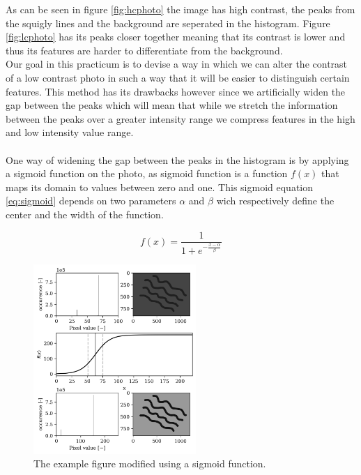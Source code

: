 As can be seen in figure \ref{fig:hcphoto} the image has high contrast, the peaks from the squigly lines and the background are seperated in the histogram. Figure \ref{fig:lcphoto} has its peaks closer together meaning that its contrast is lower and thus its features are harder to differentiate from the background.\\
Our goal in this practicum is to devise a way in which we can alter the contrast of a low contrast photo in such a way that it will be easier to distinguish certain features. This method has its drawbacks however since we artificially widen the gap between the peaks which will mean that while we stretch the information between the peaks over a greater intensity range we compress features in the high and low intensity value range.\\
\\
One way of widening the gap between the peaks in the histogram is by applying a sigmoid function on the photo, as sigmoid function is a function $f(x)$ that maps its domain to values between zero and one. This sigmoid equation \ref{eq:sigmoid} depends on two parameters $\alpha$ and $\beta$ wich respectively define the center and the width of the function.

\begin{equation}
    f(x) = \frac{1}{1+e^{-\frac{x-\alpha}{\beta}}}
    \label{eq:sigmoid}
\end{equation}
\newpage
\begin{figure}
    \centering
    \includegraphics[width=0.55\textwidth,keepaspectratio]{afbeeldingen/sigmoid_explained.png}
    \caption{The example figure modified using a sigmoid function.}
    \label{fig:sigmoid}
\end{figure}

